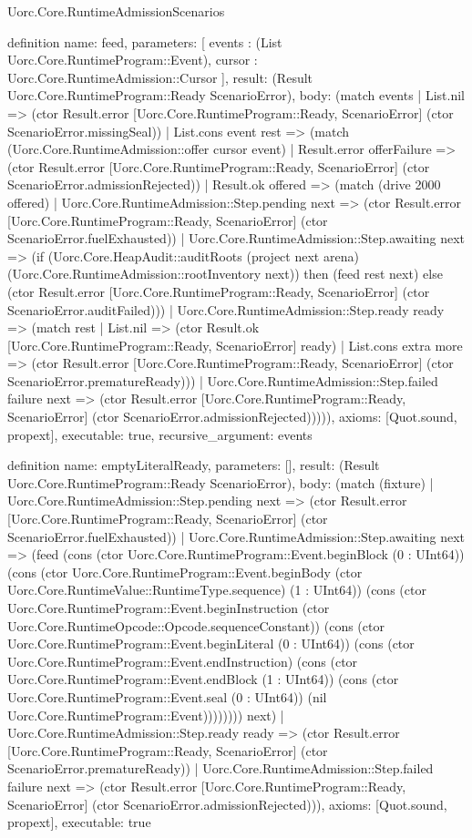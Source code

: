 \begin{lexlean}{Uorc.Core.RuntimeAdmissionScenarios}
\begin{semanticmodule}
definition{
  name: feed,
  parameters: [
    events : (List Uorc.Core.RuntimeProgram::Event),
    cursor : Uorc.Core.RuntimeAdmission::Cursor
  ],
  result: (Result Uorc.Core.RuntimeProgram::Ready ScenarioError),
  body: (match events
    | List.nil => (ctor Result.error [Uorc.Core.RuntimeProgram::Ready, ScenarioError] (ctor ScenarioError.missingSeal))
    | List.cons event rest => (match (Uorc.Core.RuntimeAdmission::offer cursor event)
      | Result.error offerFailure => (ctor Result.error [Uorc.Core.RuntimeProgram::Ready, ScenarioError] (ctor ScenarioError.admissionRejected))
      | Result.ok offered => (match (drive 2000 offered)
        | Uorc.Core.RuntimeAdmission::Step.pending next => (ctor Result.error [Uorc.Core.RuntimeProgram::Ready, ScenarioError] (ctor ScenarioError.fuelExhausted))
        | Uorc.Core.RuntimeAdmission::Step.awaiting next => (if (Uorc.Core.HeapAudit::auditRoots (project next arena) (Uorc.Core.RuntimeAdmission::rootInventory next)) then (feed rest next) else (ctor Result.error [Uorc.Core.RuntimeProgram::Ready, ScenarioError] (ctor ScenarioError.auditFailed)))
        | Uorc.Core.RuntimeAdmission::Step.ready ready => (match rest
          | List.nil => (ctor Result.ok [Uorc.Core.RuntimeProgram::Ready, ScenarioError] ready)
          | List.cons extra more => (ctor Result.error [Uorc.Core.RuntimeProgram::Ready, ScenarioError] (ctor ScenarioError.prematureReady)))
        | Uorc.Core.RuntimeAdmission::Step.failed failure next => (ctor Result.error [Uorc.Core.RuntimeProgram::Ready, ScenarioError] (ctor ScenarioError.admissionRejected))))),
  axioms: [Quot.sound, propext],
  executable: true,
  recursive_argument: events
}

definition{
  name: emptyLiteralReady,
  parameters: [],
  result: (Result Uorc.Core.RuntimeProgram::Ready ScenarioError),
  body: (match (fixture)
    | Uorc.Core.RuntimeAdmission::Step.pending next => (ctor Result.error [Uorc.Core.RuntimeProgram::Ready, ScenarioError] (ctor ScenarioError.fuelExhausted))
    | Uorc.Core.RuntimeAdmission::Step.awaiting next => (feed (cons (ctor Uorc.Core.RuntimeProgram::Event.beginBlock (0 : UInt64)) (cons (ctor Uorc.Core.RuntimeProgram::Event.beginBody (ctor Uorc.Core.RuntimeValue::RuntimeType.sequence) (1 : UInt64)) (cons (ctor Uorc.Core.RuntimeProgram::Event.beginInstruction (ctor Uorc.Core.RuntimeOpcode::Opcode.sequenceConstant)) (cons (ctor Uorc.Core.RuntimeProgram::Event.beginLiteral (0 : UInt64)) (cons (ctor Uorc.Core.RuntimeProgram::Event.endInstruction) (cons (ctor Uorc.Core.RuntimeProgram::Event.endBlock (1 : UInt64)) (cons (ctor Uorc.Core.RuntimeProgram::Event.seal (0 : UInt64)) (nil Uorc.Core.RuntimeProgram::Event)))))))) next)
    | Uorc.Core.RuntimeAdmission::Step.ready ready => (ctor Result.error [Uorc.Core.RuntimeProgram::Ready, ScenarioError] (ctor ScenarioError.prematureReady))
    | Uorc.Core.RuntimeAdmission::Step.failed failure next => (ctor Result.error [Uorc.Core.RuntimeProgram::Ready, ScenarioError] (ctor ScenarioError.admissionRejected))),
  axioms: [Quot.sound, propext],
  executable: true
}


\end{semanticmodule}
\end{lexlean}
